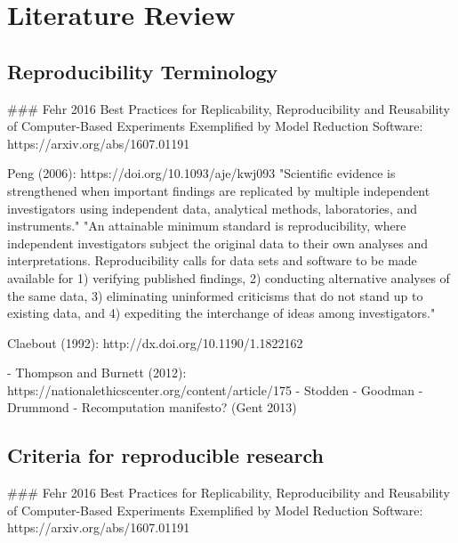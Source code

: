 
\chapter{Literature Review}
\section{Reproducibility Terminology}

### Fehr 2016  Best Practices for Replicability, Reproducibility and Reusability of Computer-Based Experiments Exemplified by Model Reduction Software: https://arxiv.org/abs/1607.01191


Peng (2006): https://doi.org/10.1093/aje/kwj093
"Scientific evidence is strengthened when important findings are replicated by multiple independent investigators using independent data, analytical methods, laboratories, and instruments."
"An attainable minimum standard is reproducibility, where independent investigators subject the original data to their own analyses and interpretations. Reproducibility calls for data sets and software to be made available for 1) verifying published findings, 2) conducting alternative analyses of the same data, 3) eliminating uninformed criticisms that do not stand up to existing data, and 4) expediting the interchange of ideas among investigators."

Claebout (1992): http://dx.doi.org/10.1190/1.1822162

- Thompson and Burnett (2012): https://nationalethicscenter.org/content/article/175
- Stodden
- Goodman
- Drummond
- Recomputation manifesto? (Gent 2013)

\section{Criteria for reproducible research}

### Fehr 2016  Best Practices for Replicability, Reproducibility and Reusability of Computer-Based Experiments Exemplified by Model Reduction Software: https://arxiv.org/abs/1607.01191

